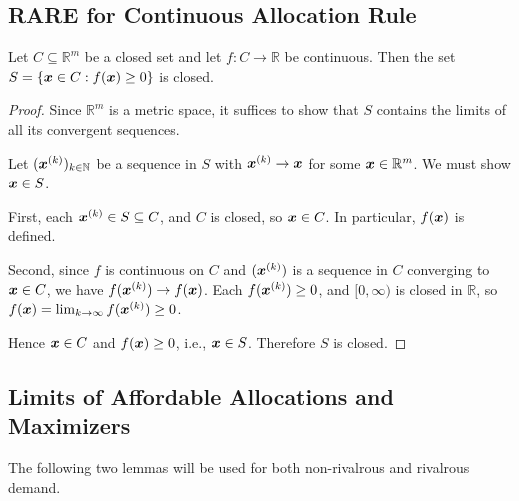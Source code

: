 \subsection{RARE for Continuous Allocation Rule}
\label{sec:exist-extra:continuous}

\begin{lemma}
\label{thm:superlevel-closed}
Let $C \subseteq \mathbb{R}^m$ be a closed set and let $f: C \to \mathbb{R}$ be continuous.
Then the set $S = \{\bm{x} \in C: f(\bm{x}) \ge 0\}$ is closed.
\end{lemma}
\begin{proof}
Since $\mathbb{R}^m$ is a metric space, it suffices to show that
$S$ contains the limits of all its convergent sequences.

Let $(\bm{x}^{(k)})_{k \in \mathbb{N}}$ be a sequence in $S$ with $\bm{x}^{(k)} \to \bm{x}$
for some $\bm{x} \in \mathbb{R}^m$. We must show $\bm{x} \in S$.

First, each $\bm{x}^{(k)} \in S \subseteq C$, and $C$ is closed, so $\bm{x} \in C$.
In particular, $f(\bm{x})$ is defined.

Second, since $f$ is continuous on $C$ and $(\bm{x}^{(k)})$ is a sequence in $C$
converging to $\bm{x} \in C$, we have $f(\bm{x}^{(k)}) \to f(\bm{x})$.
Each $f(\bm{x}^{(k)}) \ge 0$, and $[0, \infty)$ is closed in $\mathbb{R}$,
so $f(\bm{x}) = \lim_{k \to \infty} f(\bm{x}^{(k)}) \ge 0$.

Hence $\bm{x} \in C$ and $f(\bm{x}) \ge 0$, i.e., $\bm{x} \in S$. Therefore $S$ is closed.
\end{proof}

\subsection{Limits of Affordable Allocations and Maximizers}
\label{sec:exist-extra:limits}

The following two lemmas will be used for both non-rivalrous and rivalrous demand.

